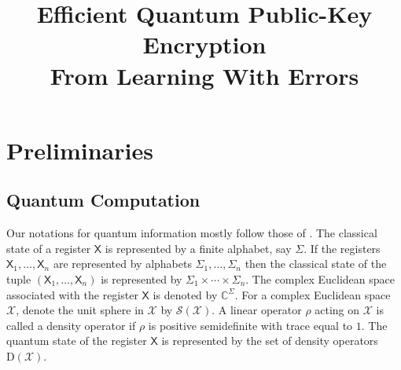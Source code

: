 \documentclass[11pt]{article}
\title{Efficient Quantum Public-Key Encryption \\ From Learning With Errors}
\author{
}
\date{}
\theoremstyle{plain}
\theoremstyle{definition}
\def\C{\mathbb{C}}
\def\X{\mathcal{X}}
\def\SX{\mathcal{S(X)}}
\begin{document}
\maketitle








\section{Preliminaries}
\label{sec:preli}



\subsection{Quantum Computation}

Our notations for quantum information mostly follow those of \cite{watrous2018theory}. The classical state of a register $\mathsf{X}$ is represented by a finite alphabet, say $\Sigma$. If the registers $\mathsf{X}_1, \dots, \mathsf{X}_n$ are represented by alphabets $\Sigma_1, \dots, \Sigma_n$ then the classical state of the tuple $(\mathsf{X}_1, \dots, \mathsf{X}_n)$ is represented by $\Sigma_1 \times \cdots \times \Sigma_n$. The complex Euclidean space associated with the register $\mathsf{X}$ is denoted by $\C^\Sigma$. For a complex Euclidean space $\X$, denote the unit sphere in $\X$ by $\SX$. A linear operator $\rho$ acting on $\X$ is called a density operator if $\rho$ is positive semidefinite with trace equal to $1$. The quantum state of the register $\mathsf{X}$ is represented by the set of density operators $\text{D}(\X)$.
\end{document}
